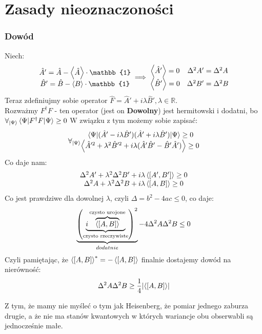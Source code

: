 \documentclass[12pt,a4paper]{report}
\newcommand{\Id}{\mathbb{1}}
\renewcommand{\emph}{\textbf}
\newenvironment{lecture}[1]{\par\medskip
   \noindent\chapter{#1} \rmfamily}{\medskip}
\begin{document}
\begin{lecture}{Zasady nieoznaczoności}
    \subsection{Dowód}
    Niech:
    \[
        \mqty{
        \hat{A}' = \hat{A} - \ev{\hat{A}}\cdot\Id \\
        \hat{B}' = \hat{B} - \ev{B}\cdot \Id}
        \implies
        \mqty{
        \ev{\hat{A}'} = 0 & \Delta^2 A' = \Delta^2 A\\
        \ev{\hat{B}'} = 0 & \Delta^2 B' = \Delta^2 B
        }
    \]
    Teraz zdefiniujmy sobie operator $\hat{F} = \hat{A}' + i \lambda \hat{B}', \lambda \in \mathbb{R}$.\\
    {\color{BrickRed} Rozważmy $F^\dagger F$ - ten operator (jest on \emph{Dowolny}) jest hermitowski i dodatni, bo $\forall_{\ket{\Psi}} \ev{F^\dagger F}{\Psi} \geq 0$}
    W związku z tym możemy sobie zapisać:
    \[
        \forall_{\ket{\Psi}} \mqty{
        \ev{(\hat{A}' - i \lambda \hat{B}')(\hat{A}' + i \lambda \hat{B}')}{\Psi} \geq 0\\
        \ev{\hat{A}'^2 + \lambda^2\hat{B}'^2 + i \lambda (\hat{A}'\hat{B}' - \hat{B}'\hat{A}')} \geq 0
        }
    \]
    Co daje nam:
    \[
        \mqty{
        \Delta^2A' + \lambda^2 \Delta^2 B' + i \lambda \ev{[A', B']} \geq 0\\
        \Delta^2 A + \lambda^2 \Delta^2 B + i \lambda \ev{[A, B]} \geq 0\\
        }
    \]
    Co jest prawdziwe dla dowolnej $\lambda$, czyli $\Delta = b^2 - 4 a c \leq 0$, co daje:
    \[
        \underbrace{\qty(\underbrace{i \overbrace{\ev{[A, B]}}^{\text{czysto urojone}}}_{\text{czysto rzeczywiste}})^2}_{dodatnie} - 4 \Delta^2A\Delta^2B \leq 0
    \]
    Czyli pamiętając, że $\ev{[A, B]}^\ast = - \ev{[A, B]}$ finalnie dostajemy dowód na nierówność:
    \begin{equation}
        \Delta^2 A \Delta^2 B \geq \frac14 \qty|\ev{\comm{A}{B}}|
        \label{eq:lec_7:heisenberg_robertson}
    \end{equation}
    
    {\color{SeaGreen}Z tym, że mamy nie myśleć o tym jak Heisenberg, że pomiar jednego zaburza drugie, a że nie ma stanów kwantowych w których wariancje obu obserwabli są jednocześnie małe.}
\end{lecture}

\end{document}
